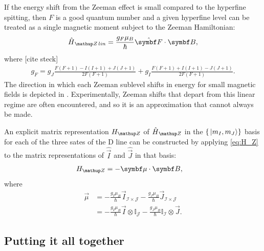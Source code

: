 If the energy shift from the Zeeman effect is small compared to the hyperfine spitting, then $F$ is a good quantum number and a given hyperfine level can be treated as a single magnetic moment subject to the Zeeman Hamiltonian:
\begin{align}
\hat H_\up{Z\,lin} = \frac{g_F\mu_B}{\hbar} \hat{\vec F} \cdot \vec B,
\end{align}
where [cite steck]
\begin{align}
g_F = g_J\frac{F(F+1) - I(I+1) + J(J+1)}{2F(F+1)}
    + g_I\frac{F(F+1) + I(I+1) - J(J+1)}{2F(F+1)}.
\end{align}
The direction in which each Zeeman sublevel shifts in energy for small magnetic fields is depicted in . Experimentally, Zeeman shifts that depart from this linear regime are often encountered, and so it is an approximation that cannot always be made.

An explicit matrix representation $H_\up{Z}$ of $\hat H_\up{Z}$ in the $\{\ket{m_I, m_J}\}$ basis for each of the three sates of the D line can be constructed by applying \eqref{eq:H_Z} to the matrix representations of $\hat{\vec I}$ and $\hat{\vec J}$ in that basis: 
\begin{align}
H_\up{Z} &= -\vec\mu\cdot \vec B,
\end{align}
where
\begin{align}
\vec\mu &=
-\frac{g_I\mu_B}{\hbar} \vec I_{\mathcal{I}\times\mathcal{J}}
- \frac{g_J\mu_B}{\hbar} \vec J_{\mathcal{I}\times\mathcal{J}}\\
&= -\frac{g_I\mu_B}{\hbar} \vec I \otimes \mathbb{I}_{\mathcal{J}}
- \frac{g_J\mu_B}{\hbar} \mathbb{I}_{\mathcal{I}} \otimes \vec J.
\end{align}

\subsection{Putting it all together}

